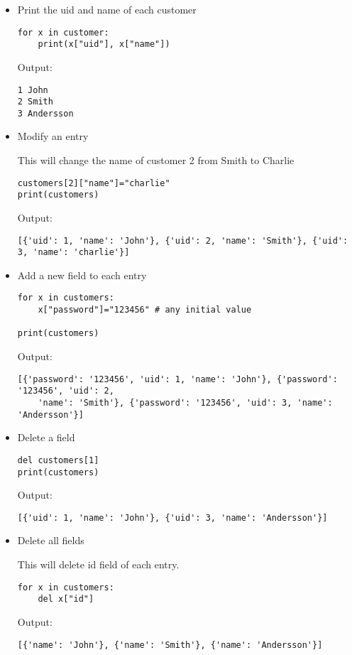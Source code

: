 \documentclass{article}
\begin{document}
\begin{itemize}
Example of a list of dictionaries
	\begin{verbatim}
customers = [
    {"uid":1,"name":"John"},
    {"uid":2,"name":"Smith"},
    {"uid":3,"name":"Andersson"},
]
print(customers)
	\end{verbatim}
Output:
	\begin{verbatim}
[{'uid': 1, 'name': 'John'}, {'uid': 2, 'name': 'Smith'}, {'uid': 3, 'name': 'Andersson'}]
	\end{verbatim}

\item Print the uid and name of each customer
	\begin{verbatim}
for x in customer:
    print(x["uid"], x["name"])
	\end{verbatim}
Output:
	\begin{verbatim}
1 John
2 Smith
3 Andersson
	\end{verbatim}

\item Modify an entry

This will change the name of customer 2 from Smith to Charlie
	\begin{verbatim}
customers[2]["name"]="charlie"
print(customers)
	\end{verbatim}
Output:
	\begin{verbatim}
[{'uid': 1, 'name': 'John'}, {'uid': 2, 'name': 'Smith'}, {'uid': 3, 'name': 'charlie'}]
	\end{verbatim}
\item Add a new field to each entry
	\begin{verbatim}
for x in customers:
    x["password"]="123456" # any initial value

print(customers)
	\end{verbatim}
Output:
	\begin{verbatim}
[{'password': '123456', 'uid': 1, 'name': 'John'}, {'password': '123456', 'uid': 2,
    'name': 'Smith'}, {'password': '123456', 'uid': 3, 'name': 'Andersson'}]
	\end{verbatim}

\item Delete a field
	\begin{verbatim}
del customers[1]
print(customers)
	\end{verbatim}
Output:
	\begin{verbatim}
[{'uid': 1, 'name': 'John'}, {'uid': 3, 'name': 'Andersson'}]
	\end{verbatim}

\item Delete all fields

This will delete id field of each entry.
	\begin{verbatim}
for x in customers:
    del x["id"]
	\end{verbatim}
Output:
	\begin{verbatim}
[{'name': 'John'}, {'name': 'Smith'}, {'name': 'Andersson'}]
	\end{verbatim}
\end{itemize}

\newpage
{}

\end{document}
